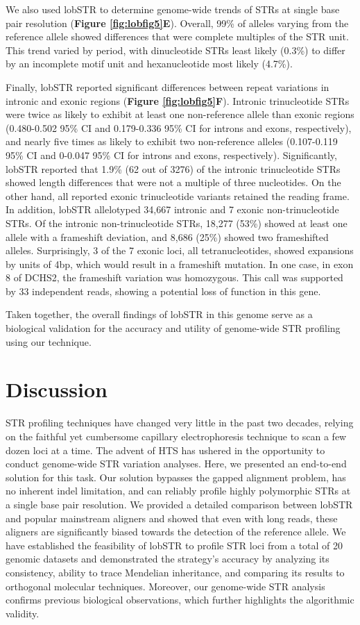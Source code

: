 We also used lobSTR to determine genome-wide trends of STRs at single base pair resolution (\textbf{Figure \ref{fig:lobfig5}E}). Overall, 99\% of alleles varying from the reference allele showed differences that were complete multiples of the STR unit. This trend varied by period, with dinucleotide STRs least likely (0.3\%) to differ by an incomplete motif unit and hexanucleotide most likely (4.7\%).

Finally, lobSTR reported significant differences between repeat variations in intronic and exonic regions (\textbf{Figure \ref{fig:lobfig5}F}). Intronic trinucleotide STRs were twice as likely to exhibit at least one non-reference allele than exonic regions (0.480-0.502 95\% CI and 0.179-0.336 95\% CI for introns and exons, respectively), and nearly five times as likely to exhibit two non-reference alleles (0.107-0.119 95\% CI and 0-0.047 95\% CI for introns and exons, respectively). Significantly, lobSTR reported that 1.9\% (62 out of 3276) of the intronic trinucleotide STRs showed length differences that were not a multiple of three nucleotides. On the other hand, all reported exonic trinucleotide variants retained the reading frame. In addition, lobSTR allelotyped 34,667 intronic and 7 exonic non-trinucleotide STRs. Of the intronic non-trinucleotide STRs, 18,277 (53\%) showed at least one allele with a frameshift deviation, and 8,686 (25\%) showed two frameshifted alleles. Surprisingly, 3 of the 7 exonic loci, all tetranucleotides, showed expansions by units of 4bp, which would result in a frameshift mutation. In one case, in exon 8 of DCHS2, the frameshift variation was homozygous. This call was supported by 33 independent reads, showing a potential loss of function in this gene.

Taken together, the overall findings of lobSTR in this genome serve as a biological validation for the accuracy and utility of genome-wide STR profiling using our technique.

\section{Discussion}
STR profiling techniques have changed very little in the past two decades, relying on the faithful yet cumbersome capillary electrophoresis technique to scan a few dozen loci at a time. The advent of HTS has ushered in the opportunity to conduct genome-wide STR variation analyses. Here, we presented an end-to-end solution for this task. Our solution bypasses the gapped alignment problem, has no inherent indel limitation, and can reliably profile highly polymorphic STRs at a single base pair resolution. We provided a detailed comparison between lobSTR and popular mainstream aligners and showed that even with long reads, these aligners are significantly biased towards the detection of the reference allele. We have established the feasibility of lobSTR to profile STR loci from a total of 20 genomic datasets and demonstrated the strategy's accuracy by analyzing its consistency, ability to trace Mendelian inheritance, and comparing its results to orthogonal molecular techniques. Moreover, our genome-wide STR analysis confirms previous biological observations, which further highlights the algorithmic validity. 

